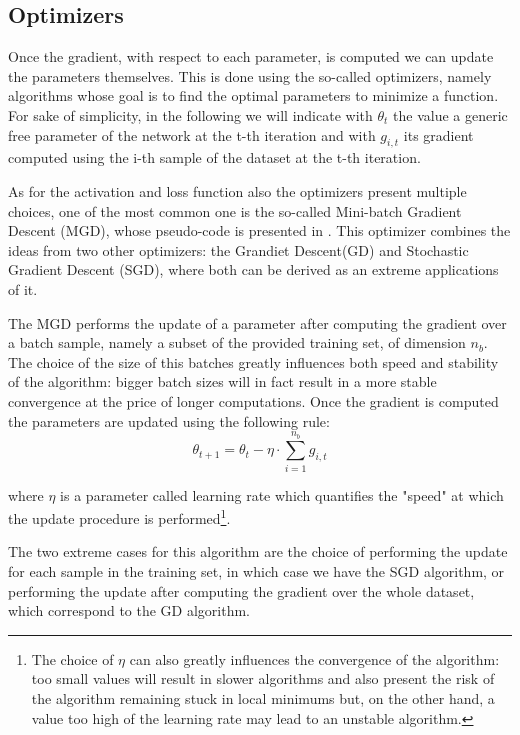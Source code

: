 \subsection{Optimizers}\label{optalg}

Once the gradient, with respect to each parameter, is computed we can update the parameters themselves. This is done using the so-called optimizers, namely algorithms whose goal is to find the optimal parameters to minimize a function.
For sake of simplicity, in the following we will indicate with $\theta_t$ the value a generic free parameter of the network at the t-th iteration and with $g_{i,t}$ its gradient computed using the i-th sample of the dataset at the t-th iteration.

As for the activation and loss function also the optimizers present multiple choices, one of the most common one is the so-called Mini-batch Gradient Descent (MGD), whose pseudo-code is presented in . This optimizer combines the ideas from two other optimizers: the Grandiet Descent(GD) and Stochastic Gradient Descent (SGD), where both can be derived as an extreme applications of it.

The MGD performs the update of a parameter after computing the gradient over a batch sample, namely a subset of the provided training set, of dimension $n_b$. The choice of the size of this batches greatly influences both speed and stability of the algorithm: bigger batch sizes will in fact result in a more stable convergence at the price of longer computations. Once the gradient is computed the parameters are updated using the following rule:
\begin{equation}
\theta_{t+1}=\theta_t-\eta \cdot \sum_{i=1}^{n_b} g_{i,t}
\end{equation}

where $\eta$ is a parameter called learning rate which quantifies the "speed" at which the update procedure is performed\footnote{The choice of $\eta$ can also greatly influences the convergence of the algorithm: too small values will result in slower algorithms and also present the risk of the algorithm remaining stuck in local minimums but, on the other hand, a value too high of the learning rate may lead to an unstable algorithm.}. 

The two extreme cases for this algorithm are the choice of performing the update for each sample in the training set, in which case we have the SGD algorithm, or performing the update after computing the gradient over the whole dataset, which correspond to the GD algorithm. 

